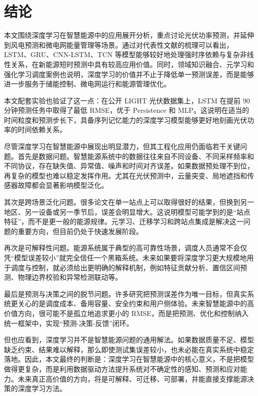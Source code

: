 \section{结论}
本文围绕深度学习在智慧能源中的应用展开分析，重点讨论光伏功率预测，并延伸到风电预测和微电网能量管理等场景。通过对代表性文献的梳理可以看出，LSTM、GRU、CNN-LSTM、TCN 等模型能够较好地处理强时序依赖与复杂非线性关系，在新能源短时预测中具有较高应用价值。同时，领域知识融合、元学习和强化学习调度案例也说明，深度学习的价值并不止于降低单一预测误差，而是能够进一步服务于储能控制、微电网运行和能源管理优化。

本文配套实验也验证了这一点：在公开 LIGHT 光伏数据集上，LSTM 在提前 90 分钟预测任务中取得了最低 RMSE，优于 Persistence 和 MLP。这说明在适当的时间粒度和预测步长下，具备序列记忆能力的深度学习模型能够更好地刻画光伏功率的时间依赖关系。

尽管深度学习在智慧能源中展现出明显潜力，但其工程化应用仍面临若干关键问题。首先是数据问题。智慧能源系统中的数据往往来自不同设备、不同采样频率和不同协议，存在缺失值、异常值、噪声和时间对齐误差。如果数据预处理不到位，再复杂的模型也难以稳定发挥作用。尤其在光伏预测中，云量突变、局地遮挡和传感器故障都会显著影响模型泛化。

其次是跨场景泛化问题。很多论文在单一站点上可以取得很好的结果，但换到另一地区、另一设备或另一季节后，误差会明显增大。这说明模型可能学到的是“站点特征”，而不是更一般的能源规律。元学习、迁移学习和跨站点集成是解决这一问题的重要方向，但目前仍处于快速发展阶段。

再次是可解释性问题。能源系统属于典型的高可靠性场景，调度人员通常不会仅凭“模型误差较小”就完全信任一个黑箱系统。未来如果要将深度学习更大规模地用于调度与控制，就必须给出更明确的解释机制，例如特征贡献分析、置信区间预测、物理边界校验和异常检测联动等。

最后是预测与决策之间的脱节问题。许多研究把预测误差作为唯一目标，但真实系统更关心的是调度成本、备用容量、安全约束和用户侧体验。未来智慧能源中的高价值方向，很可能不是孤立地追求更小的 RMSE，而是把预测、优化和控制纳入统一框架中，实现“预测-决策-反馈”闭环。

但也应看到，深度学习并不是智慧能源问题的通用解法。如果数据质量不足、模型缺乏约束、结果难以解释，那么即使测试集误差较小，也未必能在真实系统中稳定落地。因此，本文最终的判断是：深度学习在智慧能源中的核心意义，不是把模型做得更复杂，而是利用数据驱动方法提升系统对不确定性的感知、预测和应对能力。未来真正高价值的方向，将是可解释、可迁移、可部署，并能直接支撑能源决策的深度学习方法。
